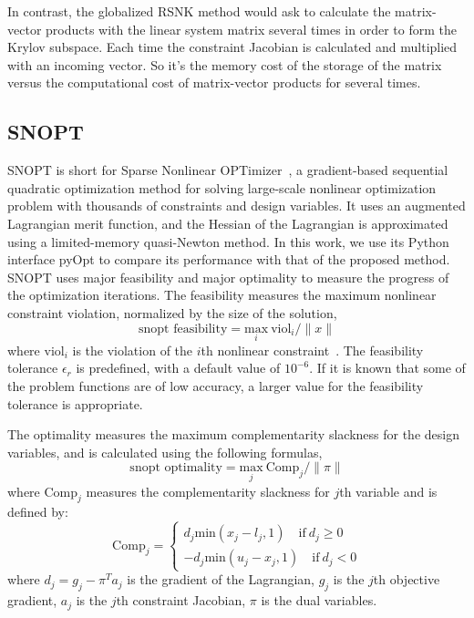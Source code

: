 In contrast, the globalized RSNK method would ask to calculate the matrix-vector 
products with the linear system matrix several times in order to form the Krylov subspace. Each time the constraint Jacobian is 
calculated and multiplied with an incoming vector. 
So it's the memory cost of the storage of the matrix versus the computational cost of matrix-vector products 
for several times. 


\subsection{SNOPT}
SNOPT is short for Sparse Nonlinear OPTimizer~\cite{gill:2002}, a gradient-based sequential 
quadratic optimization method for solving large-scale nonlinear optimization problem 
with thousands of constraints and design variables. It uses an augmented Lagrangian 
merit function, and the Hessian of the Lagrangian is approximated
using a limited-memory quasi-Newton method. In this work, we use its Python interface 
pyOpt to compare its performance with that of the proposed method. 
SNOPT uses major feasibility and major optimality to measure the progress of the 
optimization iterations. The feasibility measures the maximum nonlinear constraint violation, 
normalized by the size of the solution,
\begin{equation*}
\text{snopt feasibility} = \underset{i}{\text{max}}  \ \text{viol}_i / \lVert x \rVert 
\end{equation*}
where $\text{viol}_i$ is the violation of the $i$th nonlinear constraint~\cite{snopt_manual}. The feasibility tolerance 
$\epsilon_r$ is predefined, with a default value of $10^{-6}$. If it is known that some of the problem 
functions are of low accuracy, a larger value for the feasibility tolerance is appropriate. 

The optimality measures the maximum complementarity slackness for the design variables, 
and is calculated using the following formulas, 
\begin{equation*}
\text{snopt optimality} = \underset{j}{\text{max}}  \ \text{Comp}_j / \lVert \pi \rVert 
\end{equation*}
where $\text{Comp}_j$ measures the complementarity slackness for $j$th variable and is defined by:
\begin{equation*}
\text{Comp}_j = \begin{cases}
d_j \text{min} (x_j - l_j, 1)  \quad \text{if} \ d_j \geq 0 \\
-d_j \text{min} (u_j - x_j, 1) \quad \text{if} \ d_j < 0
\end{cases}
\end{equation*}
where $d_j = g_j - \pi^T a_j$ is the gradient of the Lagrangian, $g_j$ is the $j$th objective gradient, 
$a_j$ is the $j$th constraint Jacobian, $\pi$ is the dual variables. 

